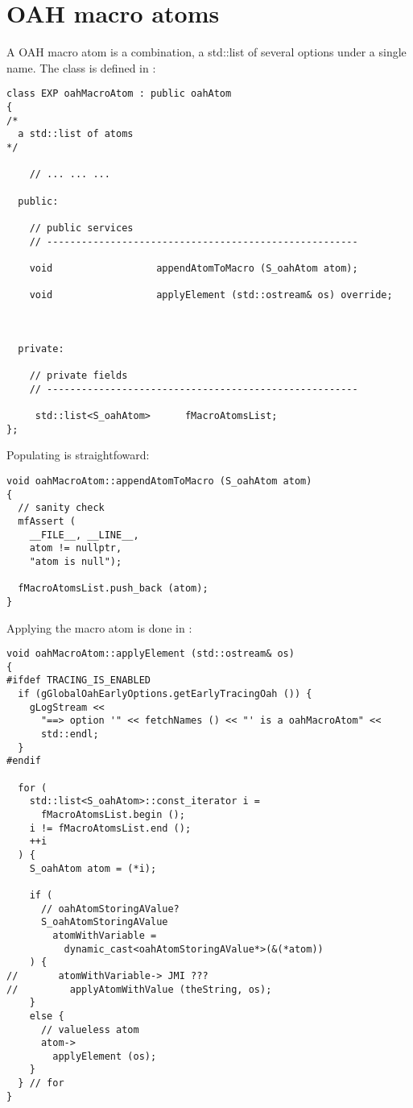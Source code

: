 \section{OAH macro atoms}

A OAH macro atom is a combination, a std::list of several options under a single name. The  class   is defined in :
\begin{lstlisting}[language=CPlusPlus]
class EXP oahMacroAtom : public oahAtom
{
/*
  a std::list of atoms
*/

	// ... ... ...

  public:

    // public services
    // ------------------------------------------------------

    void                  appendAtomToMacro (S_oahAtom atom);

    void                  applyElement (std::ostream& os) override;



  private:

    // private fields
    // ------------------------------------------------------

     std::list<S_oahAtom>      fMacroAtomsList;
};
\end{lstlisting}

Populating  is straightfoward:
\begin{lstlisting}[language=CPlusPlus]
void oahMacroAtom::appendAtomToMacro (S_oahAtom atom)
{
  // sanity check
  mfAssert (
    __FILE__, __LINE__,
    atom != nullptr,
    "atom is null");

  fMacroAtomsList.push_back (atom);
}
\end{lstlisting}

Applying the macro atom is done in :
\begin{lstlisting}[language=CPlusPlus]
void oahMacroAtom::applyElement (std::ostream& os)
{
#ifdef TRACING_IS_ENABLED
  if (gGlobalOahEarlyOptions.getEarlyTracingOah ()) {
    gLogStream <<
      "==> option '" << fetchNames () << "' is a oahMacroAtom" <<
      std::endl;
  }
#endif

  for (
    std::list<S_oahAtom>::const_iterator i =
      fMacroAtomsList.begin ();
    i != fMacroAtomsList.end ();
    ++i
  ) {
    S_oahAtom atom = (*i);

    if (
      // oahAtomStoringAValue?
      S_oahAtomStoringAValue
        atomWithVariable =
          dynamic_cast<oahAtomStoringAValue*>(&(*atom))
    ) {
//       atomWithVariable-> JMI ???
//         applyAtomWithValue (theString, os);
    }
    else {
      // valueless atom
      atom->
        applyElement (os);
    }
  } // for
}
\end{lstlisting}



